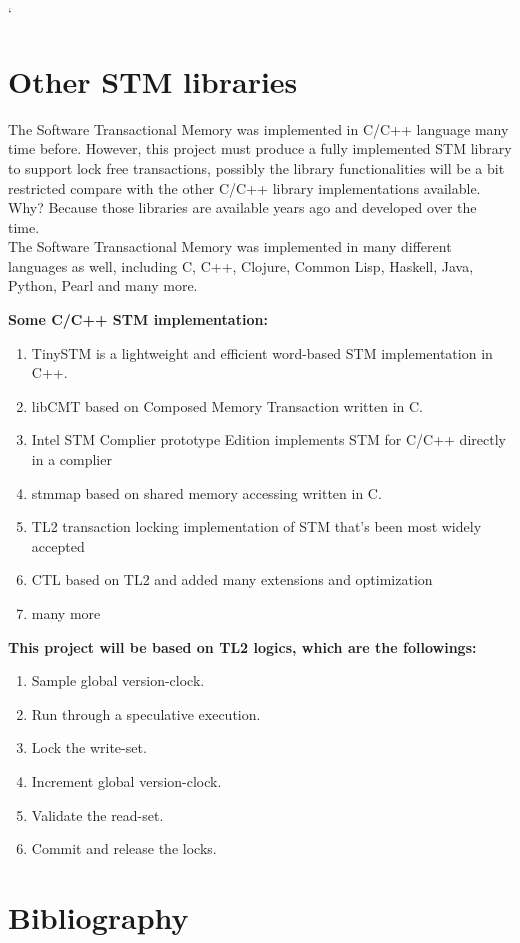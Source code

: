 \documentclass[12pt]{article}
\begin{document}
`
\section{Other STM libraries}
The Software Transactional Memory was implemented in C/C++ language many time before. However, this project must produce a fully implemented STM library to support lock free transactions, possibly the library functionalities will be a bit restricted compare with the other C/C++ library implementations available. Why? Because those libraries are available years ago and developed over the time.\\

The Software Transactional Memory was implemented in many different languages as well, including C, C++, Clojure, Common Lisp, Haskell, Java, Python, Pearl and many more.

\clearpage
\textbf{Some C/C++ STM implementation:} 
\begin{enumerate}
\item TinySTM is a lightweight and efficient word-based STM implementation in C++.
\item libCMT based on Composed Memory Transaction written in C.
\item Intel STM Complier prototype Edition implements STM for C/C++ directly in a complier
\item stmmap based on shared memory accessing written in C.
\item TL2 transaction locking implementation of STM that’s been most widely accepted
\item CTL based on TL2 and added many extensions and optimization
\item many more
\end{enumerate}

\textbf{This project will be based on TL2 logics, which are the followings:}
\begin{enumerate}
\item Sample global version-clock.
\item Run through a speculative execution.
\item Lock the write-set.
\item Increment global version-clock.
\item Validate the read-set.
\item Commit and release the locks.
\end{enumerate}



\newpage
\section{Bibliography}
\begin{center}



\end{center}
\end{document}
